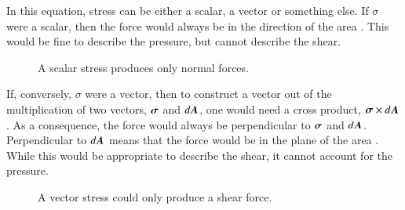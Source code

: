 In this equation, stress can be either a scalar, a vector or something
else. If $\sigma$ were a scalar, then the force would always be in the
direction of the area . This would be fine to describe the pressure, but cannot describe the shear. 

\begin{figure}
  \begin{center}
  \end{center}
  \caption[]{A scalar stress produces only normal forces.}
  \label{fig:tensor4}
\end{figure}

If, conversely, $\sigma$ were a vector, then to construct a vector out
of the multiplication of two vectors, ${\boldsymbol{\sigma}}$ and $d{\boldsymbol{A}}$, one would
need a cross product,  ${\boldsymbol{\sigma}}\times d{\boldsymbol{A}}$. As a consequence,
the force would always be perpendicular to ${\boldsymbol{\sigma}}$ and
$d{\boldsymbol{A}}$. Perpendicular to $d{\boldsymbol{A}}$ means that the force would be in
the plane of the area . While this would be appropriate to describe the shear, it cannot account for the pressure.


\begin{figure}
  \begin{center}
  \end{center}
  \caption[]{A vector stress could only produce a shear force.}
  \label{fig:tensor5}
\end{figure}

